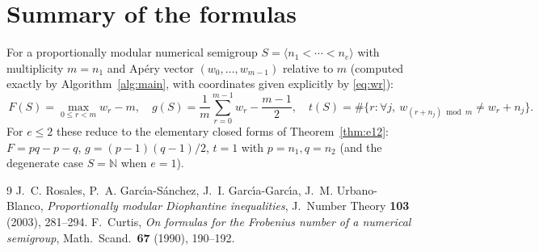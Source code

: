 \documentclass{amsart}
\theoremstyle{definition}
\newcommand{\NN}{\mathbb{N}}
\begin{document}
\section{Summary of the formulas}

For a proportionally modular numerical semigroup $S=\langle
n_1<\cdots<n_e\rangle$ with multiplicity $m=n_1$ and Ap\'ery vector
$(w_0,\dots,w_{m-1})$ relative to $m$ (computed exactly by
Algorithm~\ref{alg:main}, with coordinates given explicitly by
\eqref{eq:wr}):
\[
\boxed{\,F(S)=\max_{0\le r<m}w_r-m,\quad
g(S)=\frac1m\sum_{r=0}^{m-1}w_r-\frac{m-1}{2},\quad
t(S)=\#\{r: \forall j,\ w_{(r+n_j)\bmod m}\ne w_r+n_j\}.\,}
\]
For $e\le2$ these reduce to the elementary closed forms of
Theorem~\ref{thm:e12}: $F=pq-p-q$, $g=(p-1)(q-1)/2$, $t=1$ with
$p=n_1,q=n_2$ (and the degenerate case $S=\NN$ when $e=1$).

\begin{thebibliography}{9}
 J.~C. Rosales, P.~A. Garc\'\i a-S\'anchez,
J.~I. Garc\'\i a-Garc\'\i a, J.~M. Urbano-Blanco,
\emph{Proportionally modular Diophantine inequalities},
J.\ Number Theory \textbf{103} (2003), 281--294.
 F.~Curtis, \emph{On formulas for the Frobenius number of a
numerical semigroup}, Math.\ Scand.\ \textbf{67} (1990), 190--192.
\end{thebibliography}
\end{document}
